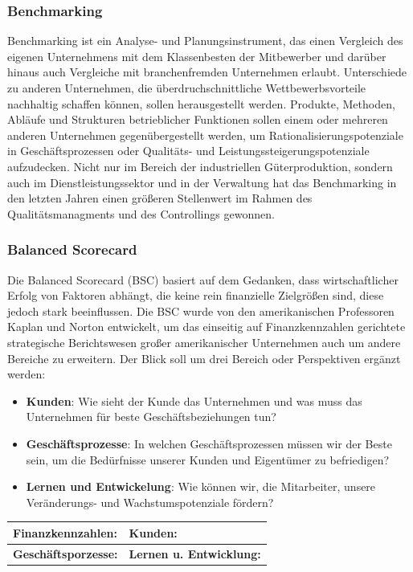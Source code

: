 \subsubsection{Benchmarking}
Benchmarking ist ein Analyse- und Planungsinstrument, das einen Vergleich des eigenen Unternehmens mit dem Klassenbesten der Mitbewerber und darüber hinaus auch Vergleiche mit branchenfremden Unternehmen erlaubt. Unterschiede zu anderen Unternehmen, die überdruchschnittliche Wettbewerbsvorteile nachhaltig schaffen können, sollen herausgestellt werden. Produkte, Methoden, Abläufe und Strukturen betrieblicher Funktionen sollen einem oder mehreren anderen Unternehmen gegenübergestellt werden, um Rationalisierungspotenziale in Geschäftsprozessen oder Qualitäts- und Leistungssteigerungspotenziale aufzudecken. Nicht nur im Bereich der industriellen Güterproduktion, sondern auch im Dienstleistungssektor und in der Verwaltung hat das Benchmarking in den letzten Jahren einen größeren Stellenwert im Rahmen des Qualitätsmanagments und des Controllings gewonnen.

\subsubsection{Balanced Scorecard}

Die Balanced Scorecard (BSC) basiert auf dem Gedanken, dass wirtschaftlicher Erfolg von Faktoren abhängt, die keine rein finanzielle Zielgrößen sind, diese jedoch stark beeinflussen. Die BSC wurde von den amerikanischen Professoren Kaplan und Norton entwickelt, um das einseitig auf Finanzkennzahlen gerichtete strategische Berichtswesen großer amerikanischer Unternehmen auch um andere Bereiche zu erweitern. Der Blick soll um drei Bereich oder Perspektiven ergänzt werden:
\begin{itemize}
	\item {\bf Kunden}: Wie sieht der Kunde das Unternehmen und was muss das Unternehmen für beste Geschäftsbeziehungen tun?
	\item {\bf Geschäftsprozesse}: In welchen Geschäftsprozessen müssen wir der Beste sein, um die Bedürfnisse unserer Kunden und Eigentümer zu befriedigen?
	\item {\bf Lernen und Entwickelung}: Wie können wir, die Mitarbeiter, unsere Veränderungs- und Wachstumspotenziale fördern?
\end{itemize}

\begin{tabular}{|p{6cm}|p{6cm}|}
	\hline
	{\bf Finanzkennzahlen:}\vspace{3cm} & {\bf Kunden:}\vspace{3cm} \\
	\hline
	{\bf Geschäftsporzesse:}\vspace{3cm} & {\bf Lernen u. Entwicklung:}\vspace{3cm}\\
	\hline
\end{tabular}

